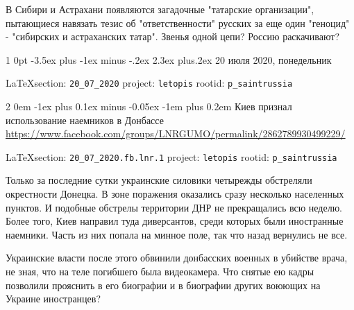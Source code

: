 \documentclass[a4paper,11pt]{extreport}
\makeatletter
\renewcommand\section{%
  \clearpage
  \@startsection{section}%
    {1}%
    {0pt}%
    {-3.5ex plus -1ex minus -.2ex}%
    {2.3ex plus.2ex}%
    {\centering\normalfont\Huge\bfseries}%
}
\renewcommand\subsection{%
  \clearpage
    \@startsection{subsection}%
    {2}%
    {0em}%
    {-1ex plus 0.1ex minus -0.05ex}%
    {-1em plus 0.2em}%
    {\scshape\bfseries\Large}%
}
\makeatother
\begin{document}
В Сибири и Астрахани появляются загадочные "татарские организации", пытающиеся
навязать тезис об "ответственности" русских за еще один "геноцид" - "сибирских
и астраханских татар".  Звенья одной цепи? Россию раскачивают?
  
  
 

 
\section{20 июля 2020, понедельник}
\label{sec:20_07_2020}
  
\vspace{0.5cm}
{\small\LaTeX section: \verb|20_07_2020| project: \verb|letopis| rootid: \verb|p_saintrussia|}
\vspace{0.5cm}
 
 
 
\subsection{Киев признал использование наемников в Донбассе}
\label{sec:20_07_2020.fb.lnr.1}
\url{https://www.facebook.com/groups/LNRGUMO/permalink/2862789930499229/}
  
\vspace{0.5cm}
{\small\LaTeX section: \verb|20_07_2020.fb.lnr.1| project: \verb|letopis| rootid: \verb|p_saintrussia|}
\vspace{0.5cm}

Только за последние сутки украинские силовики четырежды обстреляли окрестности
Донецка. В зоне поражения оказались сразу несколько населенных пунктов. И
подобные обстрелы территории ДНР не прекращались всю неделю. Более того, Киев
направил туда диверсантов, среди которых были иностранные наемники. Часть из
них попала на минное поле, так что назад вернулись не все. 

Украинские власти после этого обвинили донбасских военных в убийстве врача, не
зная, что на теле погибшего была видеокамера. Что снятые ею кадры позволили
прояснить в его биографии и в биографии других воюющих на Украине иностранцев?
\end{document}
